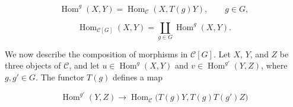 \begin{equation}
  \operatorname{Hom}^{g}(X,Y)
  =\operatorname{Hom}_{\mathcal C}(X,T(g)Y),
  \qquad g\in G,
  \tag{1.3.2.1}
\end{equation}

\begin{equation}
  \operatorname{Hom}_{\mathcal C[G]}(X,Y)
  =\coprod_{g\in G}\operatorname{Hom}^{g}(X,Y).
  \tag{1.3.2.2}
\end{equation}

We now describe the composition of morphisms in $\mathcal C[G]$.
Let $X$, $Y$, and $Z$ be three objects of $\mathcal C$, and let
$u\in\operatorname{Hom}^{g}(X,Y)$ and
$v\in\operatorname{Hom}^{g'}(Y,Z)$, where $g,g'\in G$. The functor
$T(g)$ defines a map

\begin{equation}
  \operatorname{Hom}^{g'}(Y,Z)
  \longrightarrow
  \operatorname{Hom}_{\mathcal C}
    \bigl(T(g)Y,T(g)T(g')Z\bigr)
  \tag{1.3.2.3}
\end{equation}

